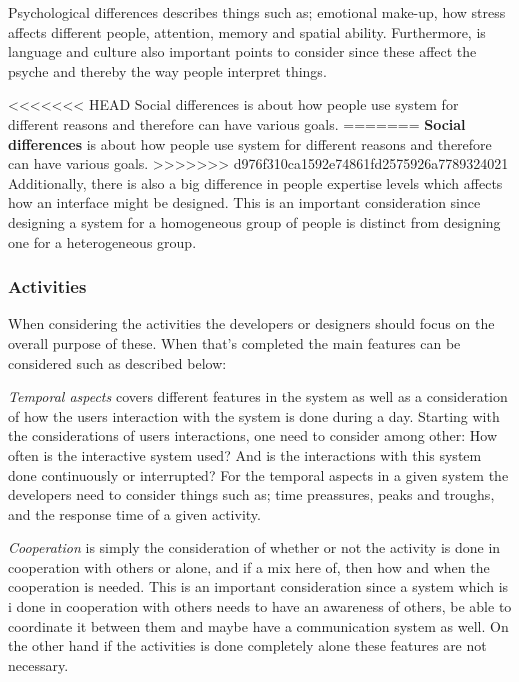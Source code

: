 Psychological differences describes things such as; emotional make-up, how stress affects different people, attention, memory and spatial ability.
Furthermore, is language and culture also important points to consider since these affect the psyche and thereby the way people interpret things.

<<<<<<< HEAD
Social differences is about how people use system for different reasons and therefore can have various goals. 
=======
\textbf{Social differences} is about how people use system for different reasons and therefore can have various goals.
>>>>>>> d976f310ca1592e74861fd2575926a7789324021
Additionally, there is also a big difference in people expertise levels which affects how an interface might be designed.
This is an important consideration since designing a system for a homogeneous group of people is  distinct from designing one for a heterogeneous group.

\subsubsection{Activities}
When considering the activities the developers or designers should focus on the overall purpose of these. When that's completed the main features can be considered such as described below:

\textit{Temporal aspects} covers different features in the system as well as a consideration of how the users interaction with the system is done during a day.
Starting with the considerations of users interactions, one need to consider among other: How often is the interactive system used? And is the interactions with this system done continuously or interrupted?
For the temporal aspects in a given system the developers need to consider things such as; time preassures, peaks and troughs, and the response time of a given activity.


\textit{Cooperation} is simply the consideration of whether or not the activity is done in cooperation with others or alone, and if a mix here of, then how and when the cooperation is needed.
This is an important consideration since a system which is i done in cooperation with others needs to have an awareness of others, be able to coordinate it between them and maybe have a communication system as well.
On the other hand if the activities is done completely alone these features are not necessary.

